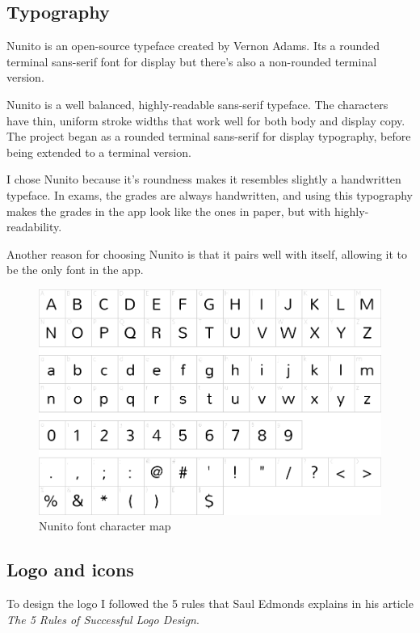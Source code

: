 \newpage
\subsection{Typography}

Nunito is an open-source typeface created by Vernon Adams. Its a rounded terminal sans-serif font for display but there's also a non-rounded terminal version.

Nunito is a well balanced, highly-readable sans-serif typeface. The characters have thin, uniform stroke widths that work well for both body and display copy. The project began as a rounded terminal sans-serif for display typography, before being extended to a terminal version.\cite{nunito-pairing}

I chose Nunito because it's roundness makes it resembles slightly a handwritten typeface. In exams, the grades are always handwritten, and using this typography makes the grades in the app look like the ones in paper, but with highly-readability. 

Another reason for choosing Nunito is that it pairs well with itself, allowing it to be the only font in the app.

\vfill
\begin{figure}[ht!]
    \center
    \includegraphics[width=0.75\columnwidth]{media/nunito-charmap.png}
    \caption{Nunito font character map\cite{nunito-charmap}}
    \label{fig:nunito-charmap}
\end{figure}
\vfill

\newpage
\subsection{Logo and icons}

To design the logo I followed the 5 rules that Saul Edmonds explains in his article  \textit{The 5 Rules of Successful Logo Design}\cite{logo-rules}.

